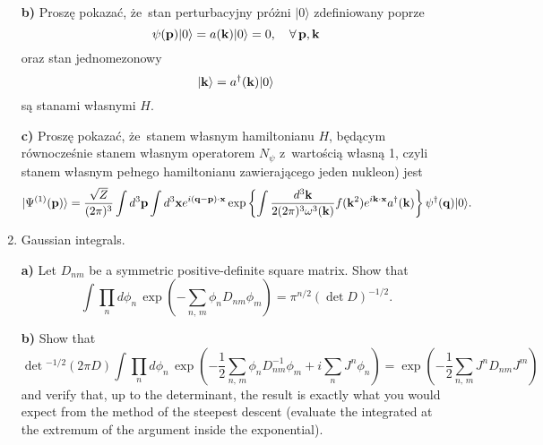 \documentclass[a4paper,11pt]{article}
\begin{document}
\begin{enumerate}
  \textbf{b)} Proszę pokazać, że~stan perturbacyjny próżni
  $| 0 \rangle$ zdefiniowany poprze
  \begin{equation}
    \label{eq:8}
    \psi( \mathbf{p} ) | 0 \rangle = a( \mathbf{k} ) | 0 \rangle = 0, \quad
    \forall \, \mathbf{p}, \mathbf{k}
  \end{equation}
  oraz stan jednomezonowy
  \begin{equation}
    \label{eq:9}
    | \mathbf{k} \rangle = a^{ \dagger }( \mathbf{k} ) | 0 \rangle
  \end{equation}
  są stanami własnymi $H$.

  \textbf{c)} Proszę pokazać, że~stanem własnym hamiltonianu $H$,
  będącym równocześnie stanem własnym operatorem $N_{ \psi }$
  z~wartością własną 1, czyli stanem własnym pełnego hamiltonianu
  zawierającego jeden nukleon) jest
  \begin{equation}
    \label{eq:10}
    | \Psi^{ ( 1 ) }( \mathbf{p} ) \rangle
    =
    \frac{ \sqrt{ Z } }{ ( 2\pi )^{ 3 } }
    \int d^{ 3 } \mathbf{p} \int d^{ 3 } \mathbf{x}
    e^{ i ( \mathbf{q} - \mathbf{p} ) \cdot \mathbf{x} }
    \exp \left\{ \int \frac{ d^{ 3 } \mathbf{k} }{ 2 ( 2\pi )^{ 3 }
        \omega^{ 3 }( \mathbf{k} ) } f( \mathbf{k}^{ 2 } )
      e^{ i \mathbf{k} \cdot \mathbf{x} } a^{ \dagger }( \mathbf{k} ) \right\}
    \psi^{ \dagger }( \mathbf{q} ) | 0 \rangle.
  \end{equation}

\item Gaussian integrals.

  \textbf{a)} Let $D_{ nm }$ be a symmetric positive-definite square
  matrix. Show that
  \begin{equation}
    \label{eq:32}
    \int \prod_{ n } d\phi_{ n } \, \exp\left( -\sum_{ n,\, m } \phi_{ n } D_{ nm }
      \phi_{ m } \right)
    = \pi^{ n/2 } ( \det D )^{ -1/2 }.
  \end{equation}

  \textbf{b)} Show that
  \begin{equation}
    \label{eq:33}
    \det{ }^{ -1/2 } ( 2 \pi D ) \int \prod_{ n } d\phi_{ n } \,
    \exp\left( -\frac{ 1 }{ 2 } \sum_{ n,\, m } \phi_{ n } D_{ nm }^{ -1 }
      \phi_{ m } + i \sum_{ n } J^{ n } \phi_{ n } \right)
    =
    \exp\left( -\frac{ 1 }{ 2 } \sum_{ n,\, m } J^{ n } D_{ nm } J^{ m } \right)
  \end{equation}
  and verify that, up to the determinant, the result is exactly what
  you would expect from the method of the steepest descent (evaluate
  the integrated at the extremum of the argument inside the
  exponential).


\end{enumerate}
\end{document}
